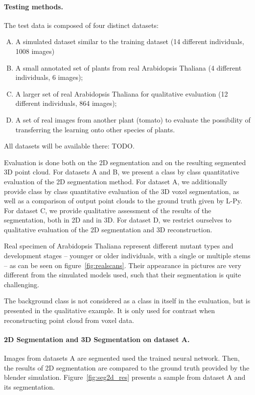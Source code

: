 \paragraph{Testing methods.} The test data is composed of four
distinct datasets:
\begin{enumerate}[A.]
    \item A simulated dataset similar to the training dataset (14 different individuals, 1008 images)
    \item A small annotated set of plants from real Arabidopsis Thaliana (4 different individuals, 6 images);
    \item A larger set of real Arabidopsis Thaliana for qualitative evaluation (12 different individuals, 864 images);
    \item A set of real images from another plant (tomato) to evaluate the possibility of transferring the learning onto other species of plants.
\end{enumerate}
All datasets will be available there: TODO.

Evaluation is done both on the 2D segmentation and on the resulting segmented 3D point cloud. For datasets A and B,
we present a class by class quantitative evaluation of the 2D segmentation method. For dataset A, we additionally  provide
class by class quantitative evaluation of the 3D voxel segmentation, as well as a comparison of output point clouds
to the ground truth given by L-Py. For dataset C, we provide qualitative assessment of the results of the segmentation,
both in 2D and in 3D. For dataset D, we restrict ourselves to qualitative evaluation of the 2D segmentation and 3D reconstruction.

Real specimen of Arabidopsis Thaliana represent different mutant types and
development stages -- younger or older individuals, with a single or multiple stems -- as can be seen on figure~\ref{fig:realscans}.
Their appearance in pictures are very different from the simulated models
used, such that their segmentation is quite challenging.

The background class is not considered as a class in itself in the evaluation, but is presented in the qualitative example. It
is only used for contrast when reconstructing point cloud from voxel data.

\paragraph{2D Segmentation and 3D Segmentation on dataset A.}
Images from datasets A are segmented used the trained neural network. Then, the results of 2D segmentation are
compared to the ground truth provided by the blender simulation. Figure~\ref{fig:seg2d_res} presents a sample from
dataset A and its segmentation.

